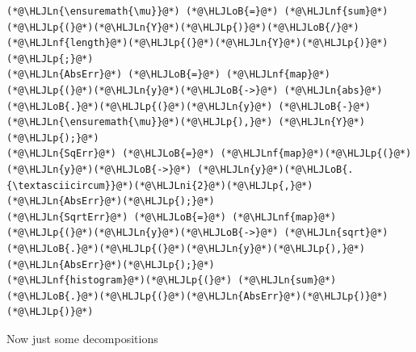\documentclass[12pt,a4paper]{article}
\newcommand{\HLJLn}[1]{#1}
\newcommand{\HLJLnf}[1]{\textcolor[RGB]{66,102,213}{#1}}
\newcommand{\HLJLni}[1]{\textcolor[RGB]{59,151,46}{#1}}
\newcommand{\HLJLoB}[1]{\textcolor[RGB]{102,102,102}{\textbf{#1}}}
\newcommand{\HLJLp}[1]{#1}
\begin{document}
\begin{lstlisting}
(*@\HLJLn{\ensuremath{\mu}}@*) (*@\HLJLoB{=}@*) (*@\HLJLnf{sum}@*)(*@\HLJLp{(}@*)(*@\HLJLn{Y}@*)(*@\HLJLp{)}@*)(*@\HLJLoB{/}@*) (*@\HLJLnf{length}@*)(*@\HLJLp{(}@*)(*@\HLJLn{Y}@*)(*@\HLJLp{)}@*) (*@\HLJLp{;}@*)
(*@\HLJLn{AbsErr}@*) (*@\HLJLoB{=}@*) (*@\HLJLnf{map}@*)(*@\HLJLp{(}@*)(*@\HLJLn{y}@*)(*@\HLJLoB{->}@*) (*@\HLJLn{abs}@*)(*@\HLJLoB{.}@*)(*@\HLJLp{(}@*)(*@\HLJLn{y}@*) (*@\HLJLoB{-}@*) (*@\HLJLn{\ensuremath{\mu}}@*)(*@\HLJLp{),}@*) (*@\HLJLn{Y}@*)(*@\HLJLp{);}@*)
(*@\HLJLn{SqErr}@*) (*@\HLJLoB{=}@*) (*@\HLJLnf{map}@*)(*@\HLJLp{(}@*)(*@\HLJLn{y}@*)(*@\HLJLoB{->}@*) (*@\HLJLn{y}@*)(*@\HLJLoB{.{\textasciicircum}}@*)(*@\HLJLni{2}@*)(*@\HLJLp{,}@*)(*@\HLJLn{AbsErr}@*)(*@\HLJLp{);}@*)
(*@\HLJLn{SqrtErr}@*) (*@\HLJLoB{=}@*) (*@\HLJLnf{map}@*)(*@\HLJLp{(}@*)(*@\HLJLn{y}@*)(*@\HLJLoB{->}@*) (*@\HLJLn{sqrt}@*)(*@\HLJLoB{.}@*)(*@\HLJLp{(}@*)(*@\HLJLn{y}@*)(*@\HLJLp{),}@*)(*@\HLJLn{AbsErr}@*)(*@\HLJLp{);}@*)
(*@\HLJLnf{histogram}@*)(*@\HLJLp{(}@*) (*@\HLJLn{sum}@*)(*@\HLJLoB{.}@*)(*@\HLJLp{(}@*)(*@\HLJLn{AbsErr}@*)(*@\HLJLp{)}@*) (*@\HLJLp{)}@*)
\end{lstlisting}


Now just some decompositions
\end{document}
